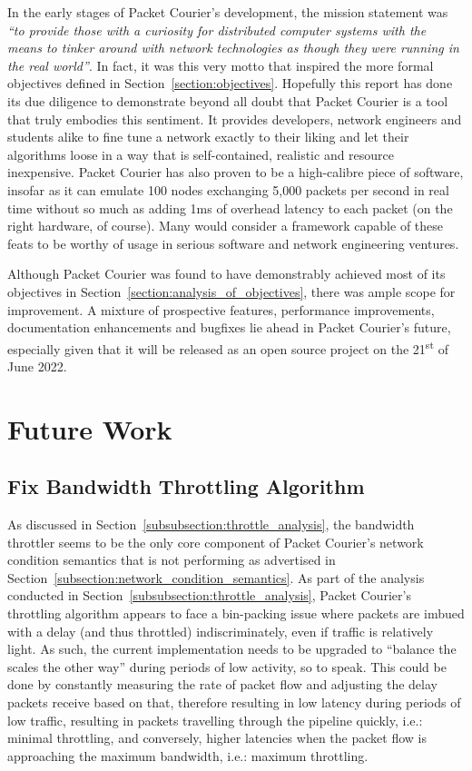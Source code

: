 In the early stages of Packet Courier's development, the mission statement was \emph{``to provide those with a
curiosity for distributed computer systems with the means to tinker around with network technologies as though they
were running in the real world''}. In fact, it was this very motto that inspired the more formal objectives defined
in Section~\ref{section:objectives}. Hopefully this report has done its due diligence to demonstrate beyond all doubt
that Packet Courier is a tool that truly embodies this sentiment. It provides developers, network engineers and
students alike to fine tune a network exactly to their liking and let their algorithms loose in a way that is
self-contained, realistic and resource inexpensive. Packet Courier has also proven to be a high-calibre piece of
software, insofar as it can emulate 100 nodes exchanging 5,000 packets per second in real time without so much as
adding 1ms of overhead latency to each packet (on the right hardware, of course). Many would consider a framework
capable of these feats to be worthy of usage in serious software and network engineering ventures.

Although Packet Courier was found to have demonstrably achieved most of its objectives in
Section~\ref{section:analysis_of_objectives}, there was ample scope for improvement. A mixture of prospective
features, performance improvements, documentation enhancements and bugfixes lie ahead in Packet Courier's future,
especially given that it will be released as an open source project on the 21\textsuperscript{st} of June 2022.


\section{Future Work}\label{section:future_work}

\subsection{Fix Bandwidth Throttling Algorithm}\label{subsection:fix_bandwidth_throttling_algorithm}

As discussed in Section~\ref{subsubsection:throttle_analysis}, the bandwidth throttler seems to be the only core
component of Packet Courier's network condition semantics that is not performing as advertised in
Section~\ref{subsection:network_condition_semantics}. As part of the analysis conducted in
Section~\ref{subsubsection:throttle_analysis}, Packet Courier's throttling algorithm appears to face a bin-packing
issue where packets are imbued with a delay (and thus throttled) indiscriminately, even if traffic is relatively
light. As such, the current implementation needs to be upgraded to ``balance the scales the other way'' during
periods of low activity, so to speak. This could be done by constantly measuring the rate of packet flow and
adjusting the delay packets receive based on that, therefore resulting in low latency during periods of low traffic,
resulting in packets travelling through the pipeline quickly, i.e.: minimal throttling, and conversely, higher
latencies when the packet flow is approaching the maximum bandwidth, i.e.: maximum throttling.

